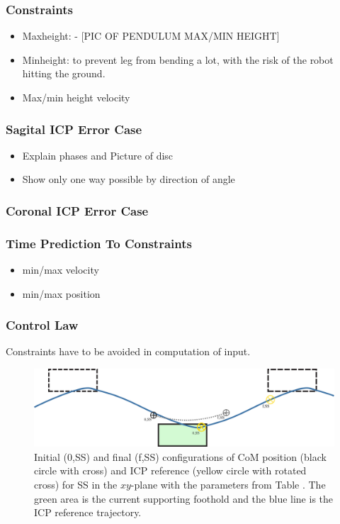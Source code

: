 \subsubsection{Constraints}
\begin{itemize}
	\item Maxheight: - [PIC OF PENDULUM MAX/MIN HEIGHT]
	\item Minheight: to prevent leg from bending a lot, with the risk of the robot hitting the ground.
	\item Max/min height velocity 
\end{itemize}

\subsubsection{Sagital ICP Error Case}
\begin{itemize}
	\item Explain phases and Picture of disc
	\item Show only one way possible by direction of angle
\end{itemize}

\subsubsection{Coronal ICP Error Case}


\subsubsection{Time Prediction To Constraints}
\begin{itemize}
	\item min/max velocity
	\item min/max position
\end{itemize}

\subsubsection{Control Law}
Constraints have to be avoided in computation of input.\\


\begin{figure}[h]
\centering
  \includegraphics[width=.8\linewidth]{STYLESTUFF/ICPplan3StepComICPrSS.png}
   \caption{Initial (0,SS) and final (f,SS) configurations of \ac{CoM} position (black circle with cross) and \ac{ICP} reference (yellow circle with rotated cross) for \ac{SS} in the $xy$-plane with the parameters from Table . The green area is the current supporting foothold and the blue line is the \ac{ICP} reference trajectory.}
    \label{fig:3foot}
\end{figure}


